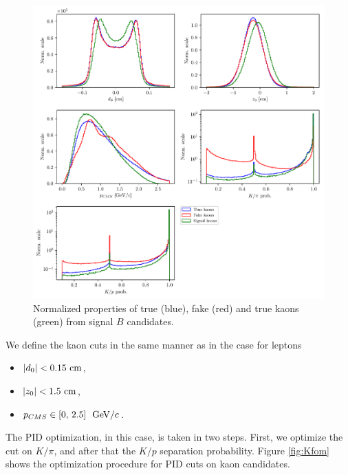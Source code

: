 \begin{figure}[!htb]
	\centering
	\includegraphics[width=\linewidth]{fig/FSP_kaon_vars}
	\captionsetup{width=.8\linewidth}
	\caption{Normalized properties of true (blue), fake (red) and true kaons (green) from signal $B$ candidates.}
	\label{fig:Kvars}
\end{figure}

We define the kaon cuts in the same manner as in the case for leptons
\begin{itemize}
	\item $\vert d_0 \vert < 0.15\mathrm{~cm}$,
	\item $\vert z_0 \vert < 1.5\mathrm{~cm}$,
	\item $p_{CMS} \in [0,\,2.5]~\mathrm{~GeV}/c$.
\end{itemize}

The PID optimization, in this case, is taken in two steps. First, we optimize the cut on $K / \pi$, and after that the $K/p$ separation probability. Figure \ref{fig:Kfom} shows the optimization procedure for PID cuts on kaon candidates.

